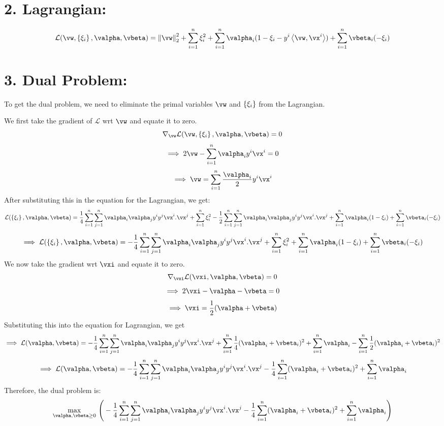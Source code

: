 \documentclass[a4paper,11pt]{article}
\begin{document}
\begin{mlsolution}
\section*{2. Lagrangian:}
$$\mathcal{L}(\vw,\bc{\xi_i},\valpha,\vbeta) =  \norm{\vw}_2^2 + \sum_{i=1}^n\xi_i^2 + \sum_{i=1}^n\valpha_i (1- \xi_i - y^i\ip{\vw}{\vx^i}) + \sum_{i=1}^n\vbeta_i(-\xi_i)  $$

\section*{3. Dual Problem:}
To get the dual problem, we need to eliminate the primal variables $\vw$ and $\left\{{\xi_i}\right\}$ from the Lagrangian.

We first take the gradient of $\mathcal{L}$ wrt $\vw$ and equate it to zero.
$$\nabla_\vw\mathcal{L}(\vw,\bc{\xi_i},\valpha,\vbeta) = 0$$
$$\implies 2\vw - \sum_{i=1}^n\valpha_i y^i{\vx^i} = 0  $$
$$\implies \vw = \sum_{i=1}^n\frac{\valpha_i}{2}y^i{\vx^i}$$
After substituting this in the equation for the Lagrangian, we get:
$$\mathcal{L}(\bc{\xi_i},\valpha,\vbeta) = \frac{1}{4}\sum_{i=1}^n \sum_{j=1}^n\valpha_i\valpha_j y^i y^j {\vx^i.}{\vx^j} + \sum_{i=1}^n\xi_i^2 - \frac{1}{2}\sum_{i=1}^n \sum_{j=1}^n\valpha_i\valpha_j y^i y^j {\vx^i.}{\vx^j} + \sum_{i=1}^n\valpha_i (1- \xi_i)  + \sum_{i=1}^n\vbeta_i(-\xi_i)  $$
$$\implies \mathcal{L}(\bc{\xi_i},\valpha,\vbeta) = -\frac{1}{4}\sum_{i=1}^n \sum_{j=1}^n\valpha_i\valpha_j y^i y^j {\vx^i.}{\vx^j} + \sum_{i=1}^n\xi_i^2 + \sum_{i=1}^n\valpha_i (1- \xi_i) + \sum_{i=1}^n\vbeta_i(-\xi_i)  $$
We now take the gradient wrt $\vxi$ and equate it to zero.
$$\nabla_\vxi\mathcal{L}(\vxi,\valpha,\vbeta) = 0$$
$$\implies 2\vxi - \valpha - \vbeta = 0$$
$$\implies \vxi = \frac{1}{2} (\valpha + \vbeta)$$
Substituting this into the equation for Lagrangian, we get
$$\implies \mathcal{L}(\valpha,\vbeta) = -\frac{1}{4}\sum_{i=1}^n \sum_{j=1}^n\valpha_i\valpha_j y^i y^j {\vx^i.}{\vx^j} + \sum_{i=1}^n\frac{1}{4}(\valpha_i+\vbeta_i)^2 + \sum_{i=1}^n\valpha_i  - \sum_{i=1}^n\frac{1}{2}(\valpha_i+\vbeta_i)^2$$
$$\implies \mathcal{L}(\valpha,\vbeta) = -\frac{1}{4}\sum_{i=1}^n \sum_{j=1}^n\valpha_i\valpha_j y^i y^j {\vx^i.}{\vx^j} - \frac{1}{4}\sum_{i=1}^n(\valpha_i+\vbeta_i)^2 + \sum_{i=1}^n\valpha_i$$
Therefore, the dual problem is:
$$ \underset{\valpha,\vbeta \geq 0}{\max} \ \Bigg( -\frac{1}{4}\sum_{i=1}^n \sum_{j=1}^n\valpha_i\valpha_j y^i y^j {\vx^i.}{\vx^j} - \frac{1}{4}\sum_{i=1}^n(\valpha_i+\vbeta_i)^2 + \sum_{i=1}^n\valpha_i \Bigg) $$


\end{mlsolution}
\end{document}
